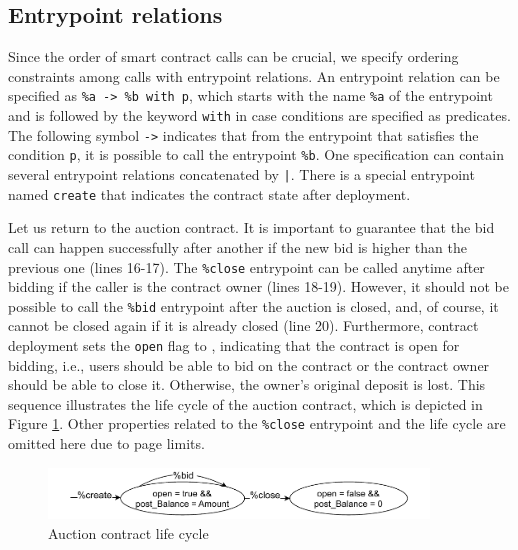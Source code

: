 \documentclass[runningheads]{llncs}
\begin{document}
\subsection{Entrypoint relations}
\label{sec:entrypoint-relations}
Since the order of smart contract
calls can be crucial, we specify ordering constraints among calls with
 entrypoint relations. An entrypoint relation can be specified as
\lstinline/%a -> %b with p/, which starts with the name
\lstinline/%a/ of the entrypoint and is followed by the keyword
\lstinline/with/ in case conditions are specified as predicates. The
following symbol \lstinline/->/ indicates that from the entrypoint
that satisfies the condition \lstinline/p/, it is possible  to call
the entrypoint \lstinline/%b/. One specification can
contain several entrypoint relations concatenated by
\lstinline/|/. There is a special entrypoint named \lstinline/create/
that indicates the contract state after deployment. 

Let us return to the auction contract. It is important to guarantee
that  the bid call can happen successfully after another if the new bid is higher than the previous
one (lines 16-17). The  \lstinline/%close/ entrypoint can be called
anytime after bidding if the caller is the contract owner (lines 18-19). However, it
should not be possible to call the  \lstinline/%bid/ entrypoint after
the auction is closed, and, of course, it cannot be closed
again if it is already closed (line 20).  Furthermore, contract deployment sets the  \lstinline/open/ flag to
\TRUE, indicating that the contract is open for bidding, i.e., users
should be able to bid on the contract or the contract owner should be
able to close it. Otherwise, the owner's original
deposit is lost. This sequence  illustrates
the life cycle of the auction contract, which is depicted in Figure
\ref{fig:auction-life-cycle}. Other properties related to the \lstinline|%close| entrypoint and the life cycle are omitted here due to page limits. %

\begin{figure}[tp]
    \centering
    \includegraphics[width=0.9\textwidth]{auction}
    \caption{Auction contract life cycle}
    \label{fig:auction-life-cycle}
\end{figure}
\end{document}
